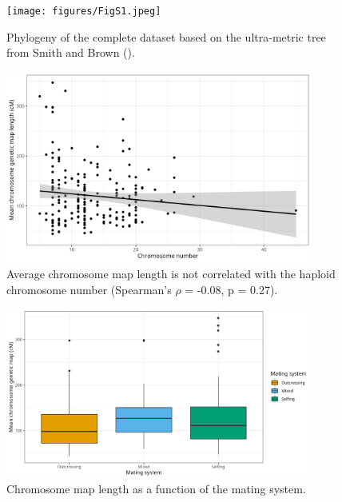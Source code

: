 \documentclass{article}
\begin{document}
\begin{figure}[h!]
  \texttt{[image: figures/FigS1.jpeg]}
  \centering
  \caption{Phylogeny of the complete dataset based on the ultra-metric tree from Smith and Brown (\citeyear{smithConstructingBroadlyInclusive2018}).
  }
  \label{figure:FigS1}
\end{figure}



\begin{figure}[h!]
  \includegraphics[width=0.9\textwidth]{figures/FigS2.jpeg}
  \centering
  \caption{Average chromosome map length is not correlated with the haploid chromosome number (Spearman’s $\rho$ = -0.08, p = 0.27).
  }
  \label{figure:FigS2}
\end{figure}


\begin{figure}[h!]
  \includegraphics[width=0.9\textwidth]{figures/FigS3.jpeg}
  \centering
  \caption{Chromosome map length as a function of the mating system.
  }
  \label{figure:FigS3}
\end{figure}
\end{document}
